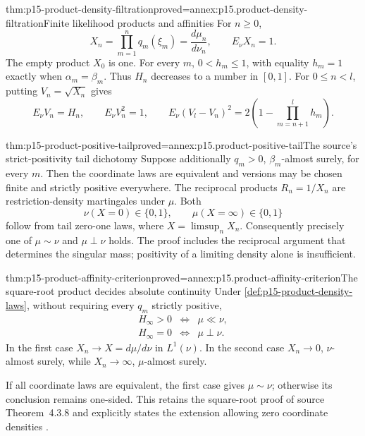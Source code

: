 \begin{hblemma}{thm:p15-product-density-filtration}{proved=annex:p15.product-density-filtration}{Finite likelihood products and affinities}
For \(n\geq0\),
\[
 X_n=\prod_{m=1}^nq_m(\xi_m)
       =\frac{d\mu_n}{d\nu_n},\qquad E_\nu X_n=1.
\]
The empty product \(X_0\) is one. For every \(m\),
\(0<h_m\leq1\), with equality \(h_m=1\) exactly when
\(\alpha_m=\beta_m\). Thus \(H_n\) decreases to a number in \([0,1]\).
For \(0\leq n<l\), putting \(V_n=\sqrt{X_n}\) gives
\[
 E_\nu V_n=H_n,\qquad E_\nu V_n^2=1,\qquad
 E_\nu(V_l-V_n)^2=2\left(1-\prod_{m=n+1}^lh_m\right).
\]
\end{hblemma}

\begin{hbtheorem}{thm:p15-product-positive-tail}{proved=annex:p15.product-positive-tail}{The source's strict-positivity tail dichotomy}
Suppose additionally \(q_m>0\), \(\beta_m\)-almost surely,
for every \(m\). Then the coordinate laws are equivalent and
versions may be chosen finite and strictly positive everywhere.
The reciprocal products \(R_n=1/X_n\) are restriction-density
martingales under \(\mu\). Both
\[
                  \nu(X=0)\in\{0,1\},\qquad
                  \mu(X=\infty)\in\{0,1\}
\]
follow from tail zero-one laws, where \(X=\limsup_nX_n\).
Consequently precisely one of \(\mu\sim\nu\) and
\(\mu\perp\nu\) holds.
The proof includes the reciprocal argument that determines the
singular mass; positivity of a limiting density alone is insufficient.
\end{hbtheorem}

\begin{hbtheorem}{thm:p15-product-affinity-criterion}{proved=annex:p15.product-affinity-criterion}{The square-root product decides absolute continuity}
Under \cref{def:p15-product-density-laws}, without requiring every
\(q_m\) strictly positive,
\[
 \begin{array}{lll}
 H_\infty>0 &\Longleftrightarrow& \mu\ll\nu,\\
 H_\infty=0 &\Longleftrightarrow& \mu\perp\nu.
 \end{array}
\]
In the first case \(X_n\to X=d\mu/d\nu\) in \(L^1(\nu)\).
In the second case \(X_n\to0\), \(\nu\)-almost surely, while
\(X_n\to\infty\), \(\mu\)-almost surely.

If all coordinate laws are equivalent, the first case gives
\(\mu\sim\nu\); otherwise its conclusion remains one-sided.
This retains the square-root proof of source Theorem~4.3.8 and
explicitly states the extension allowing zero coordinate densities
\cite[pp.~229--230]{DurrettPTEAuthor2019}.
\end{hbtheorem}

